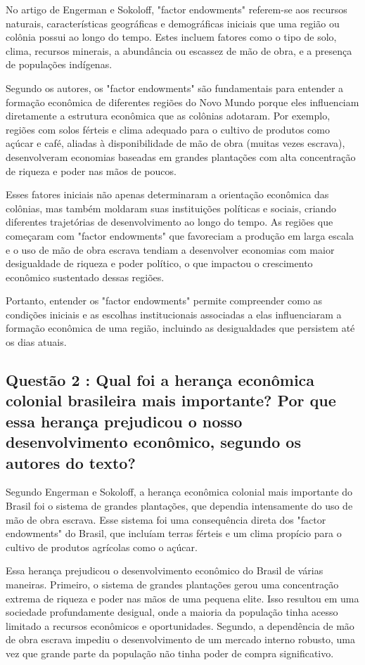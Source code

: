 \documentclass[a4paper,12pt]{article}[abntex2]
\begin{document}
No artigo de Engerman e Sokoloff, "factor endowments" referem-se aos recursos naturais, características geográficas e demográficas iniciais que uma região ou colônia possui ao longo do tempo. Estes incluem fatores como o tipo de solo, clima, recursos minerais, a abundância ou escassez de mão de obra, e a presença de populações indígenas.

Segundo os autores, os "factor endowments" são fundamentais para entender a formação econômica de diferentes regiões do Novo Mundo porque eles influenciam diretamente a estrutura econômica que as colônias adotaram. Por exemplo, regiões com solos férteis e clima adequado para o cultivo de produtos como açúcar e café, aliadas à disponibilidade de mão de obra (muitas vezes escrava), desenvolveram economias baseadas em grandes plantações com alta concentração de riqueza e poder nas mãos de poucos.

Esses fatores iniciais não apenas determinaram a orientação econômica das colônias, mas também moldaram suas instituições políticas e sociais, criando diferentes trajetórias de desenvolvimento ao longo do tempo. As regiões que começaram com "factor endowments" que favoreciam a produção em larga escala e o uso de mão de obra escrava tendiam a desenvolver economias com maior desigualdade de riqueza e poder político, o que impactou o crescimento econômico sustentado dessas regiões.

Portanto, entender os "factor endowments" permite compreender como as condições iniciais e as escolhas institucionais associadas a elas influenciaram a formação econômica de uma região, incluindo as desigualdades que persistem até os dias atuais.

\subsection{\textbf{Questão 2 : Qual foi a herança econômica colonial brasileira mais importante? Por que essa herança prejudicou o nosso desenvolvimento econômico, segundo os autores do texto?
}}

Segundo Engerman e Sokoloff, a herança econômica colonial mais importante do Brasil foi o sistema de grandes plantações, que dependia intensamente do uso de mão de obra escrava. Esse sistema foi uma consequência direta dos "factor endowments" do Brasil, que incluíam terras férteis e um clima propício para o cultivo de produtos agrícolas como o açúcar.

Essa herança prejudicou o desenvolvimento econômico do Brasil de várias maneiras. Primeiro, o sistema de grandes plantações gerou uma concentração extrema de riqueza e poder nas mãos de uma pequena elite. Isso resultou em uma sociedade profundamente desigual, onde a maioria da população tinha acesso limitado a recursos econômicos e oportunidades. Segundo, a dependência de mão de obra escrava impediu o desenvolvimento de um mercado interno robusto, uma vez que grande parte da população não tinha poder de compra significativo.
\end{document}
